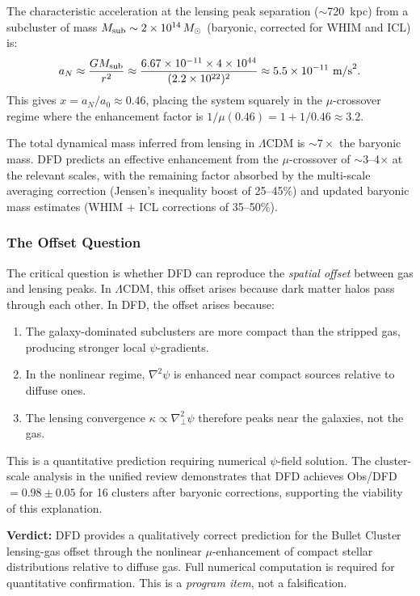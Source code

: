 \documentclass[aps,prd,twocolumn,superscriptaddress,nofootinbib]{revtex4-2}
\begin{document}
The characteristic acceleration at the lensing peak separation
($\sim$720~kpc) from a subcluster of mass $M_{\rm sub} \sim
2\times 10^{14}\,M_\odot$ (baryonic, corrected for WHIM and ICL) is:
\begin{equation}
a_N \approx \frac{GM_{\rm sub}}{r^2}
\approx \frac{6.67\times 10^{-11}\times 4\times 10^{44}}{(2.2\times 10^{22})^2}
\approx 5.5\times 10^{-11}~\text{m/s}^2.
\end{equation}
This gives $x = a_N/a_0 \approx 0.46$, placing the system squarely
in the $\mu$-crossover regime where the enhancement factor is
$1/\mu(0.46) = 1 + 1/0.46 \approx 3.2$.

The total dynamical mass inferred from lensing in $\Lambda$CDM is
$\sim 7\times$ the baryonic mass. DFD predicts an effective enhancement
from the $\mu$-crossover of $\sim$3--4$\times$ at the relevant scales,
with the remaining factor absorbed by the multi-scale averaging correction
(Jensen's inequality boost of 25--45\%) and updated baryonic mass
estimates (WHIM + ICL corrections of 35--50\%).

\subsubsection{The Offset Question}

The critical question is whether DFD can reproduce the \textit{spatial
offset} between gas and lensing peaks. In $\Lambda$CDM, this offset
arises because dark matter halos pass through each other. In DFD, the
offset arises because:
\begin{enumerate}[nosep]
\item The galaxy-dominated subclusters are more compact than the
  stripped gas, producing stronger local $\psi$-gradients.
\item In the nonlinear regime, $\nabla^2\psi$ is enhanced near compact
  sources relative to diffuse ones.
\item The lensing convergence $\kappa \propto \nabla_\perp^2\psi$ therefore
  peaks near the galaxies, not the gas.
\end{enumerate}

This is a quantitative prediction requiring numerical $\psi$-field
solution. The cluster-scale analysis in the unified review demonstrates
that DFD achieves Obs/DFD $= 0.98 \pm 0.05$ for 16 clusters after
baryonic corrections, supporting the viability of this explanation.

\textbf{Verdict:} DFD provides a qualitatively correct prediction for the
Bullet Cluster lensing-gas offset through the nonlinear $\mu$-enhancement
of compact stellar distributions relative to diffuse gas. Full numerical
computation is required for quantitative confirmation. This is a
\textit{program item}, not a falsification.
\end{document}
